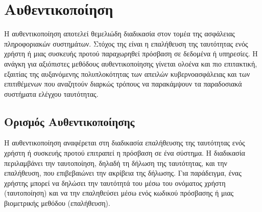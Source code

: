 \section{Αυθεντικοποίηση}
\label{sec:theory_auth}

Η αυθεντικοποίηση αποτελεί θεμελιώδη διαδικασία στον τομέα της ασφάλειας πληροφοριακών συστημάτων. Στόχος της είναι η επαλήθευση της ταυτότητας ενός χρήστη ή μιας συσκευής προτού παραχωρηθεί πρόσβαση σε δεδομένα ή υπηρεσίες. Η ανάγκη για αξιόπιστες μεθόδους αυθεντικοποίησης γίνεται ολοένα και πιο επιτακτική, εξαιτίας της αυξανόμενης πολυπλοκότητας των απειλών κυβερνοασφάλειας και των επιτιθέμενων που αναζητούν διαρκώς τρόπους να παρακάμψουν τα παραδοσιακά συστήματα ελέγχου ταυτότητας.


\subsection{Ορισμός Αυθεντικοποίησης}
Η αυθεντικοποίηση αναφέρεται στη διαδικασία επαλήθευσης της ταυτότητας ενός χρήστη ή συσκευής προτού επιτραπεί η πρόσβαση σε ένα σύστημα. Η διαδικασία περιλαμβάνει την ταυτοποίηση, δηλαδή τη δήλωση της ταυτότητας, και την επαλήθευση, που επιβεβαιώνει την ακρίβεια της δήλωσης. Για παράδειγμα, ένας χρήστης μπορεί να δηλώσει την ταυτότητά του μέσω του ονόματος χρήστη (ταυτοποίηση) και να την επαληθεύσει μέσω ενός κωδικού πρόσβασης ή μιας βιομετρικής μεθόδου (επαλήθευση).


